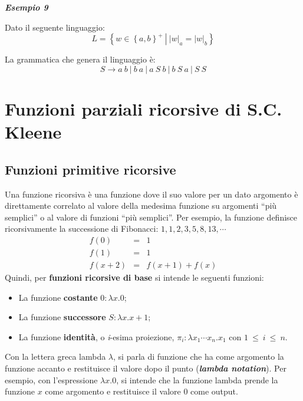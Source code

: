 \documentclass[a4paper]{article}
\newcommand{\dquotes}[1]{``#1''}
\begin{document}
	\noindent
	\textcolor{Green4}{\textbf{\emph{Esempio 9}}}
	
	\noindent
	Dato il seguente linguaggio:
	\begin{equation*}
		L = \left\{w \in \left\{a,b\right\}^{+} \: \left| \: |w|_{a} = |w|_{b} \right.\right\}
	\end{equation*}

	\noindent
	La grammatica che genera il linguaggio è:
	\begin{equation*}
		S \longrightarrow a \: b \: | \: b \: a \: | \: a \: S \: b \: | \: b \: S \: a \: | \: S \: S
	\end{equation*}\newpage
	
	\section{Funzioni parziali ricorsive di S.C. Kleene}
	
	\subsection{Funzioni primitive ricorsive}
	
	Una funzione ricorsiva è una funzione dove il suo valore per un dato argomento è direttamente correlato al valore della medesima funzione su argomenti \dquotes{più semplici} o al valore di funzioni \dquotes{più semplici}.\newline
	Per esempio, la funzione definisce ricorsivamente la successione di Fibonacci: $1, 1, 2, 3, 5, 8, 13, \cdots$
	\begin{equation*}
		\begin{array}{lll}
			f\left(0\right) 	& = & 1 \\
			f\left(1\right) 	& = & 1 \\
			f\left(x+2\right) 	& = & f\left(x+1\right) + f\left(x\right)
		\end{array}
	\end{equation*}
	Quindi, per \textcolor{Red3}{\textbf{funzioni ricorsive di base}} si intende le seguenti funzioni:
	\begin{itemize}
		\item La funzione \textbf{costante} $0: \lambda x. 0$;
		\item La funzione \textbf{successore} $S: \lambda x. x+1$;
		\item La funzione \textbf{identità}, o \emph{i}-esima proiezione, $\pi_{i}: \lambda x_{1} \cdots x_{n}. x_{1}$ con $1~\le~i~\le~n$.
	\end{itemize}
	Con la lettera greca lambda $\lambda$, si parla di funzione che ha come argomento la funzione accanto e restituisce il valore dopo il punto (\textbf{\emph{lambda notation}}). Per esempio, con l'espressione $\lambda x. 0$, si intende che la funzione lambda prende la funzione $x$ come argomento e restituisce il valore $0$ come output.\newline
	
\end{document}
